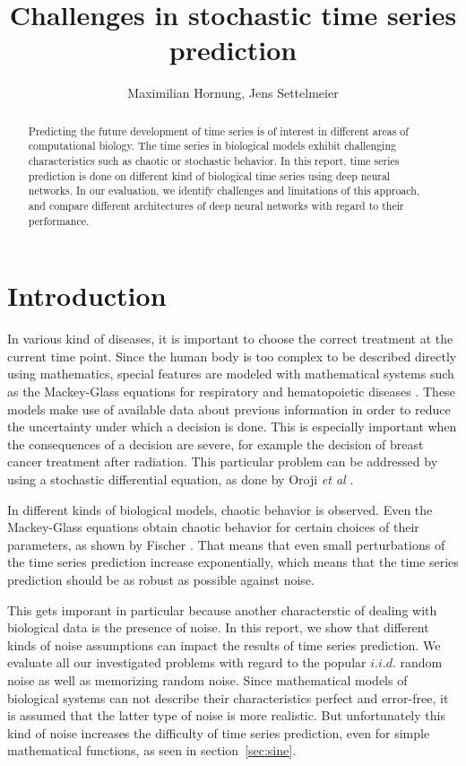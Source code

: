\documentclass{article}
\title{Challenges in stochastic time series prediction}
\author{Maximilian Hornung, Jens Settelmeier}
\begin{document}
\maketitle

\begin{abstract}
    Predicting the future development of time series is of interest in different
    areas of computational biology. The time series in biological models exhibit
    challenging characteristics such as chaotic or stochastic behavior. In this
    report, time series prediction is done on different kind of biological time
    series using deep neural networks. In our evaluation, we identify challenges
    and limitations of this approach, and compare different architectures of
    deep neural networks with regard to their performance.
\end{abstract}

\section{Introduction}

In various kind of diseases, it is important to choose the correct treatment at
the current time point. Since the human body is too complex to be described
directly using mathematics, special features are modeled with mathematical
systems such as the Mackey-Glass equations for respiratory and hematopoietic 
diseases \cite{mackey1977}. These models make use of available data about
previous information in order to reduce the uncertainty under which a decision
is done. This is especially important when the consequences of a decision are
severe, for example the decision of breast cancer treatment after radiation.
This particular problem can be addressed by using a stochastic differential 
equation, as done by Oroji \textit{et al} \cite{oroji2016}.

In different kinds of biological models, chaotic behavior is observed. Even the
Mackey-Glass equations obtain chaotic behavior for certain choices of their
parameters, as shown by Fischer \cite{farmer1982}. That means that even small
perturbations of the time series prediction increase exponentially, which means
that the time series prediction should be as robust as possible against noise.

This gets imporant in particular because another characterstic of dealing with 
biological data is the presence of noise. In 
this report, we show that different kinds of noise assumptions can impact the
results of time series prediction. We evaluate all our investigated problems
with regard to the popular $i.i.d.$ random noise as well as memorizing random
noise. Since mathematical models of biological systems can not describe their
characteristics perfect and error-free, it is assumed that the latter type of
noise is more realistic. But unfortunately this kind of noise increases the
difficulty of time series prediction, even for simple mathematical functions, 
as seen in section~\ref{sec:sine}.
\end{document}
